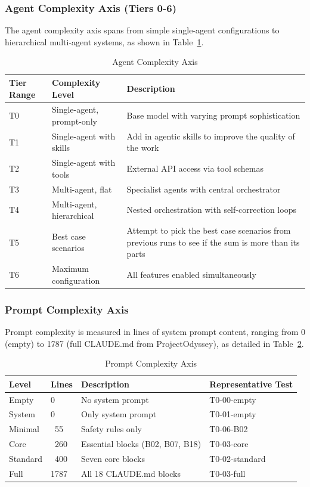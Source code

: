 \documentclass[11pt]{article}
\begin{document}
\subsubsection{Agent Complexity Axis (Tiers 0-6)}

The agent complexity axis spans from simple single-agent configurations to hierarchical multi-agent systems, as shown in Table~\ref{tab:agent-complexity}.

\begin{table}[htbp]
\centering
\caption{Agent Complexity Axis}
\label{tab:agent-complexity}
\begin{tabularx}{\textwidth}{llX}
\toprule
Tier Range & Complexity Level & Description \\
\midrule
T0 & Single-agent, prompt-only & Base model with varying prompt sophistication \\
T1 & Single-agent with skills & Add in agentic skills to improve the quality of the work \\
T2 & Single-agent with tools & External API access via tool schemas \\
T3 & Multi-agent, flat & Specialist agents with central orchestrator \\
T4 & Multi-agent, hierarchical & Nested orchestration with self-correction loops \\
T5 & Best case scenarios & Attempt to pick the best case scenarios from previous runs to see if the sum is more than its parts \\
T6 & Maximum configuration & All features enabled simultaneously \\
\bottomrule
\end{tabularx}
\end{table}


\subsubsection{Prompt Complexity Axis}

Prompt complexity is measured in lines of system prompt content, ranging from 0
(empty) to 1787 (full CLAUDE.md from ProjectOdyssey\cite{projectodyssey}), as detailed in Table~\ref{tab:prompt-complexity}.

\begin{table}[htbp]
\centering
\caption{Prompt Complexity Axis}
\label{tab:prompt-complexity}
\begin{tabular}{llll}
\toprule
Level & Lines & Description & Representative Test \\
\midrule
Empty & 0 & No system prompt & T0-00-empty \\
System & 0 & Only system prompt & T0-01-empty \\
Minimal & ~55 & Safety rules only & T0-06-B02 \\
Core & ~260 & Essential blocks (B02, B07, B18) & T0-03-core \\
Standard & ~400 & Seven core blocks & T0-02-standard \\
Full & 1787 & All 18 CLAUDE.md blocks & T0-03-full \\
\bottomrule
\end{tabular}
\end{table}
\end{document}
